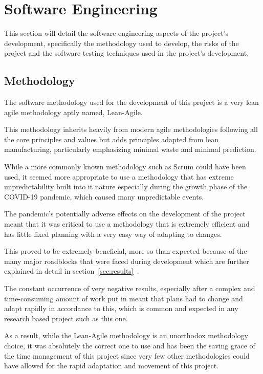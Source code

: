 \documentclass[12pt]{article}
\newcommand{\sentence}{} %
\newcommand{\fullref}[1]{\ref{#1}~\nameref{#1}}
\begin{document}
    \pagebreak


    \section{Software Engineering}\label{sec:software-engineering}

    \tab
    This section will detail the software engineering aspects of the project's development, specifically the
    methodology used to develop, the risks of the project and the software testing techniques used in the project's
    development.

    \subsection{Methodology}\label{subsec:methodology}

    \tab
    The software methodology used for the development of this project is a very lean agile methodology aptly named,
    Lean-Agile.
    \sentence
    This methodology inherits heavily from modern agile methodologies following all the core principles and values
    but adds principles adapted from lean manufacturing, particularly emphasizing minimal waste and minimal
    prediction.
    \sentence
    While a more commonly known methodology such as Scrum could have been used, it seemed more appropriate to use a
    methodology that has extreme unpredictability built into it nature especially during the growth phase of the
    COVID-19 pandemic, which caused many unpredictable events.
    \sentence
    The pandemic's potentially adverse effects on the development of the project meant that it was critical to use a
    methodology that is extremely efficient and has little fixed planning with a very easy way of adapting to changes.
    \sentence
    This proved to be extremely beneficial, more so than expected because of the many major roadblocks that were
    faced during development which are further explained in detail in section~\fullref{sec:results}.
    \sentence
    The constant occurrence of very negative results, especially after a complex and time-consuming amount of work
    put in meant that plans had to change and adapt rapidly in accordance to this, which is common and expected in
    any research based project such as this one.
    \sentence
    As a result, while the Lean-Agile methodology is an unorthodox methodology choice, it was absolutely the correct
    one to use and has been the saving grace of the time management of this project since very few other
    methodologies could have allowed for the rapid adaptation and movement of this project.
\end{document}
